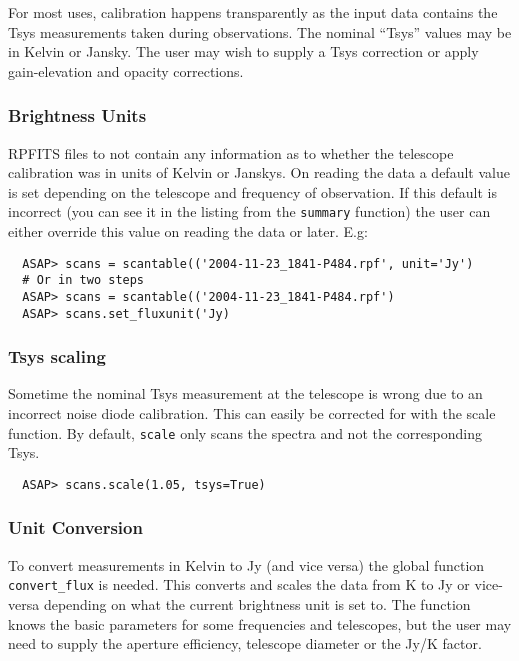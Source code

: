 \documentclass[11pt]{article}
\newcommand{\cmd}[1]{{\tt #1}}
\begin{document}
For most uses, calibration happens transparently as the input data
contains the Tsys measurements taken during observations. The nominal
``Tsys'' values may be in Kelvin or Jansky. The user may wish to
supply a Tsys correction or apply gain-elevation and opacity
corrections.

\subsubsection{Brightness Units}

RPFITS files to not contain any information as to whether the telescope
calibration was in units of Kelvin or Janskys.  On reading the data a
default value is set depending on the telescope and frequency of
observation.  If this default is incorrect (you can see it in the
listing from the \cmd{summary} function) the user can either override
this value on reading the data or later.  E.g:

\begin{verbatim}
  ASAP> scans = scantable(('2004-11-23_1841-P484.rpf', unit='Jy')
  # Or in two steps
  ASAP> scans = scantable(('2004-11-23_1841-P484.rpf')
  ASAP> scans.set_fluxunit('Jy)
\end{verbatim}

\subsubsection{Tsys scaling}

Sometime the nominal Tsys measurement at the telescope is wrong due to
an incorrect noise diode calibration. This can easily be corrected for
with the scale function. By default, \cmd{scale} only scans the
spectra and not the corresponding Tsys.

\begin{verbatim}
  ASAP> scans.scale(1.05, tsys=True) 
\end{verbatim}

\subsubsection{Unit Conversion}

To convert measurements in Kelvin to Jy (and vice versa) the global
function \cmd{convert\_flux} is needed. This converts and scales the data
from K to Jy or vice-versa depending on what the current brightness unit is
set to. The function knows the basic parameters for some frequencies
and telescopes, but the user may need to supply the aperture
efficiency, telescope diameter or the Jy/K factor.
\end{document}
